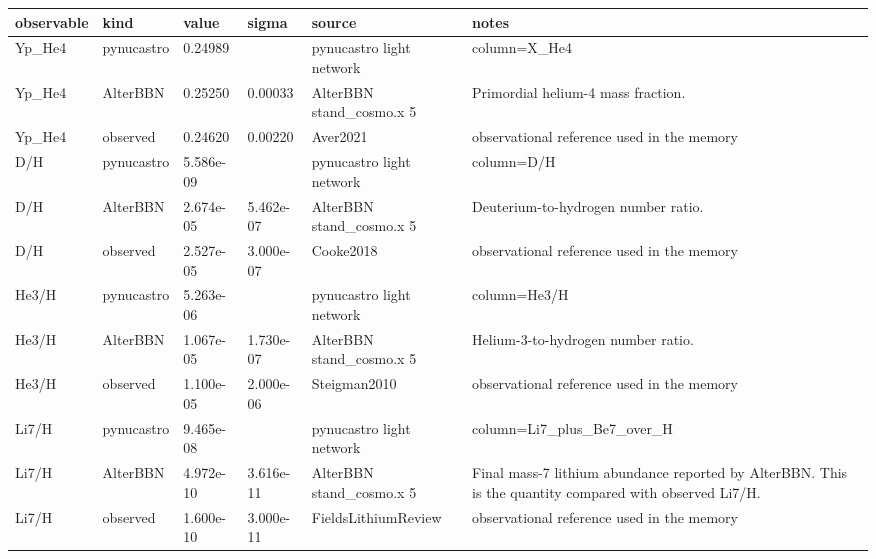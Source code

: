 \begin{tabular}{llllll}
\toprule
observable & kind & value & sigma & source & notes \\
\midrule
Yp_He4 & pynucastro & 0.24989 &  & pynucastro light network & column=X_He4 \\
Yp_He4 & AlterBBN & 0.25250 & 0.00033 & AlterBBN stand_cosmo.x 5 & Primordial helium-4 mass fraction. \\
Yp_He4 & observed & 0.24620 & 0.00220 & Aver2021 & observational reference used in the memory \\
D/H & pynucastro & 5.586e-09 &  & pynucastro light network & column=D/H \\
D/H & AlterBBN & 2.674e-05 & 5.462e-07 & AlterBBN stand_cosmo.x 5 & Deuterium-to-hydrogen number ratio. \\
D/H & observed & 2.527e-05 & 3.000e-07 & Cooke2018 & observational reference used in the memory \\
He3/H & pynucastro & 5.263e-06 &  & pynucastro light network & column=He3/H \\
He3/H & AlterBBN & 1.067e-05 & 1.730e-07 & AlterBBN stand_cosmo.x 5 & Helium-3-to-hydrogen number ratio. \\
He3/H & observed & 1.100e-05 & 2.000e-06 & Steigman2010 & observational reference used in the memory \\
Li7/H & pynucastro & 9.465e-08 &  & pynucastro light network & column=Li7_plus_Be7_over_H \\
Li7/H & AlterBBN & 4.972e-10 & 3.616e-11 & AlterBBN stand_cosmo.x 5 & Final mass-7 lithium abundance reported by AlterBBN. This is the quantity compared with observed Li7/H. \\
Li7/H & observed & 1.600e-10 & 3.000e-11 & FieldsLithiumReview & observational reference used in the memory \\
\bottomrule
\end{tabular}
